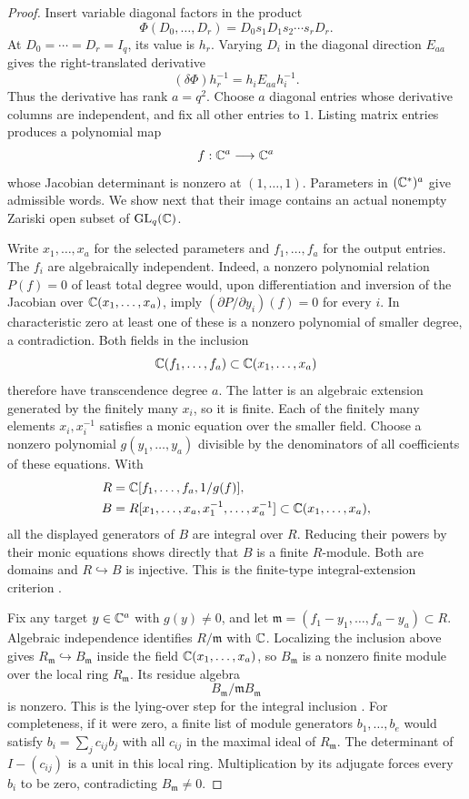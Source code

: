 \begin{proof}
Insert variable diagonal factors in the product
\[
\Phi(D_0,\ldots,D_r)=D_0s_1D_1s_2\cdots s_rD_r.
\]
At $D_0=\cdots=D_r=I_q$, its value is $h_r$.  Varying $D_i$ in the
diagonal direction $E_{aa}$ gives the right-translated derivative
\[
(\delta\Phi)h_r^{-1}=h_iE_{aa}h_i^{-1}.
\]
Thus the derivative has rank $a=q^2$.  Choose $a$ diagonal entries
whose derivative columns are independent, and fix all other entries
to $1$.  Listing matrix entries produces a polynomial map
\[
f:\mathbb C^a\longrightarrow\mathbb C^a
\]
whose Jacobian determinant is nonzero at $(1,\ldots,1)$.  Parameters in
$(\mathbb C^*)^a$ give admissible words.  We show next that their image contains
an actual nonempty Zariski open subset of $\operatorname{GL}_q(\mathbb C)$.

Write $x_1,\ldots,x_a$ for the selected parameters and
$f_1,\ldots,f_a$ for the output entries.  The $f_i$ are algebraically
independent.  Indeed, a nonzero polynomial relation $P(f)=0$ of least
total degree would, upon differentiation and inversion of the Jacobian
over $\mathbb C(x_1,\ldots,x_a)$, imply
$(\partial P/\partial y_i)(f)=0$ for every $i$.  In characteristic zero
at least one of these is a nonzero polynomial of smaller degree,
a contradiction.  Both fields in the inclusion
\[
\mathbb C(f_1,\ldots,f_a)\subset\mathbb C(x_1,\ldots,x_a)
\]
therefore have transcendence degree $a$.  The latter is an algebraic
extension generated by the finitely many $x_i$, so it is finite.
Each of the finitely many
elements $x_i,x_i^{-1}$ satisfies a monic equation over the smaller
field.  Choose a nonzero polynomial $g(y_1,\ldots,y_a)$ divisible by
the denominators of all coefficients of these equations.  With
\begin{align*}
R&=\mathbb C[f_1,\ldots,f_a,1/g(f)],\\
B&=R[x_1,\ldots,x_a,x_1^{-1},\ldots,x_a^{-1}]
   \subset\mathbb C(x_1,\ldots,x_a),
\end{align*}
all the displayed generators of $B$ are integral over $R$.
Reducing their powers by their monic equations shows directly that
$B$ is a finite $R$-module.  Both are domains and $R\hookrightarrow B$
is injective.  This is the finite-type integral-extension criterion
\citep[Tag~02JJ, Lemma~10.36.5]{stacksProject}.

Fix any target $y\in\mathbb C^a$ with $g(y)\ne0$, and let
$\mathfrak m=(f_1-y_1,\ldots,f_a-y_a)\subset R$.  Algebraic independence
identifies $R/\mathfrak m$ with $\mathbb C$.  Localizing the inclusion above
gives $R_{\mathfrak m}\hookrightarrow B_{\mathfrak m}$ inside the field
$\mathbb C(x_1,\ldots,x_a)$, so $B_{\mathfrak m}$ is a nonzero finite module
over the local ring $R_{\mathfrak m}$.  Its residue algebra
\begin{equation}\label{gen:eq:nonzero-fiber}
B_{\mathfrak m}/\mathfrak mB_{\mathfrak m}
\end{equation}
is nonzero.  This is the lying-over step for the integral inclusion
\citep[Tag~00GQ, Lemma~10.36.17]{stacksProject}.
For completeness, if it were zero, a finite list of module
generators $b_1,\ldots,b_e$ would satisfy
$b_i=\sum_j c_{ij}b_j$ with all $c_{ij}$ in the maximal ideal of
$R_{\mathfrak m}$.  The determinant of $I-(c_{ij})$ is a unit in this
local ring.  Multiplication by its adjugate forces every $b_i$ to be
zero, contradicting $B_{\mathfrak m}\ne0$.


\end{proof}
